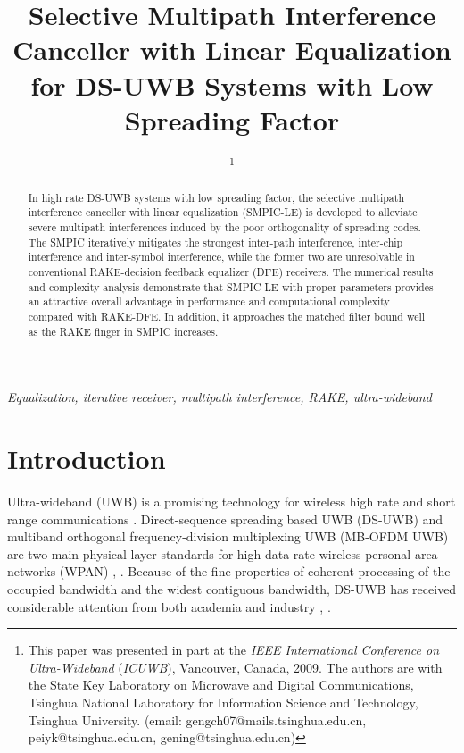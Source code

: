 \documentclass[journal]{IEEEtran}
\begin{document}
\title{Selective Multipath Interference Canceller with Linear Equalization for DS-UWB Systems with Low Spreading Factor}

\author{
\thanks{This paper was presented in part at the {\it IEEE International Conference on Ultra-Wideband} ({\it ICUWB}), Vancouver, Canada, 2009.
The authors are with the State Key Laboratory on Microwave and
Digital Communications, Tsinghua National Laboratory for Information
Science and Technology, Tsinghua University. (email:
gengch07@mails.tsinghua.edu.cn, peiyk@tsinghua.edu.cn,
gening@tsinghua.edu.cn) }}




\maketitle


\begin{abstract}

In high rate DS-UWB systems with low spreading factor, the selective
multipath interference canceller with linear equalization (SMPIC-LE)
is developed to alleviate severe multipath interferences induced by
the poor orthogonality of spreading codes. The SMPIC iteratively
mitigates the strongest inter-path interference, inter-chip
interference and inter-symbol interference, while the former two are
unresolvable in conventional RAKE-decision feedback equalizer (DFE)
receivers. The numerical results and complexity analysis demonstrate
that SMPIC-LE with proper parameters provides an attractive overall
advantage in performance and computational complexity compared with
RAKE-DFE. In addition, it approaches the matched filter bound well
as the RAKE finger in SMPIC increases.
\end{abstract}

\begin{keywords}
\emph{Equalization, iterative receiver, multipath interference, RAKE, ultra-wideband}
\end{keywords}


\section{Introduction}
Ultra-wideband (UWB) is a promising technology for wireless high
rate and short range communications \cite{UWB overview}.
Direct-sequence spreading based UWB (DS-UWB) and multiband
orthogonal frequency-division multiplexing UWB (MB-OFDM UWB) are two
main physical layer standards for high data rate wireless personal
area networks (WPAN) \cite{DS-UWB proposal}, \cite{OFDM-UWB
standard}. Because of the fine properties of coherent processing of
the occupied bandwidth and the widest contiguous bandwidth, DS-UWB
has received considerable attention from both academia and industry
\cite{DS advantage}, \cite{DSSS UWB}.
\end{document}
